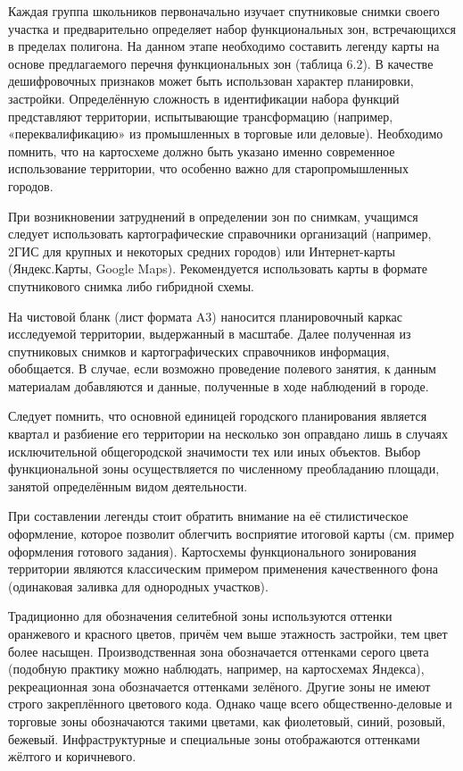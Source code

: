 \documentclass[
  11pt,
  russian,
]{book}
\begin{document}
Каждая группа школьников первоначально изучает спутниковые снимки своего участка и предварительно определяет набор
функциональных зон, встречающихся в пределах полигона. На данном этапе необходимо составить легенду карты на основе предлагаемого перечня
функциональных зон (таблица 6.2). В качестве дешифровочных признаков может быть использован характер планировки,
застройки. Определённую сложность в идентификации набора функций представляют территории, испытывающие трансформацию (например, «переквалификацию» из промышленных в торговые или деловые). Необходимо помнить, что на картосхеме должно быть указано именно современное использование территории, что особенно важно для старопромышленных городов.

При возникновении затруднений в определении зон по снимкам, учащимся следует использовать картографические справочники
организаций (например, 2ГИС для крупных и некоторых средних городов) или Интернет-карты (Яндекс.Карты, Google Maps). Рекомендуется использовать карты в формате спутникового снимка либо гибридной схемы.

На чистовой бланк (лист формата A3) наносится планировочный каркас исследуемой территории, выдержанный в масштабе. Далее
полученная из спутниковых снимков и картографических справочников информация, обобщается. В случае, если возможно проведение полевого занятия, к данным материалам добавляются и данные, полученные в ходе наблюдений в городе.

Следует помнить, что основной единицей городского планирования является квартал и разбиение его территории на
несколько зон оправдано лишь в случаях исключительной общегородской значимости тех или иных объектов. Выбор функциональной зоны осуществляется по численному преобладанию площади, занятой определённым видом деятельности.

При составлении легенды стоит обратить внимание на её стилистическое оформление, которое позволит облегчить восприятие итоговой
карты (см. пример оформления готового задания). Картосхемы функционального зонирования территории являются классическим примером применения качественного фона (одинаковая заливка для однородных участков).

Традиционно для обозначения селитебной зоны используются оттенки оранжевого и красного цветов, причём чем выше этажность
застройки, тем цвет более насыщен. Производственная зона обозначается оттенками серого цвета (подобную практику можно наблюдать, например, на картосхемах Яндекса), рекреационная зона обозначается оттенками зелёного. Другие зоны не имеют строго закреплённого цветового кода. Однако чаще всего общественно-деловые и торговые зоны обозначаются такими цветами, как
фиолетовый, синий, розовый, бежевый. Инфраструктурные и специальные зоны отображаются оттенками жёлтого и коричневого.
\end{document}
